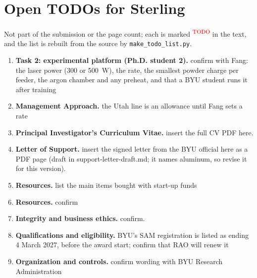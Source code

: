 \clearpage
\section*{Open TODOs for Sterling}
\noindent Not part of the submission or the page count; each is marked \textcolor{red}{\textsuperscript{TODO}} in the text, and the list is rebuilt from the source by \texttt{make\_todo\_list.py}.
\begin{enumerate}\setlength{\itemsep}{2pt}
\item \textbf{Task 2: experimental platform (Ph.D. student 2).} confirm with Fang: the laser power (300 or 500~W), the rate, the smallest powder charge per feeder, the argon chamber and any preheat, and that a BYU student runs it after training
\item \textbf{Management Approach.} the Utah line is an allowance until Fang sets a rate
\item \textbf{Principal Investigator's Curriculum Vitae.} insert the full CV PDF here.
\item \textbf{Letter of Support.} insert the signed letter from the BYU official here as a PDF page (draft in support-letter-draft.md; it names aluminum, so revise it for this version).
\item \textbf{Resources.} list the main items bought with start-up funds
\item \textbf{Resources.} confirm
\item \textbf{Integrity and business ethics.} confirm.
\item \textbf{Qualifications and eligibility.} BYU's SAM registration is listed as ending 4 March 2027, before the award start; confirm that RAO will renew it
\item \textbf{Organization and controls.} confirm wording with BYU Research Administration
\end{enumerate}
